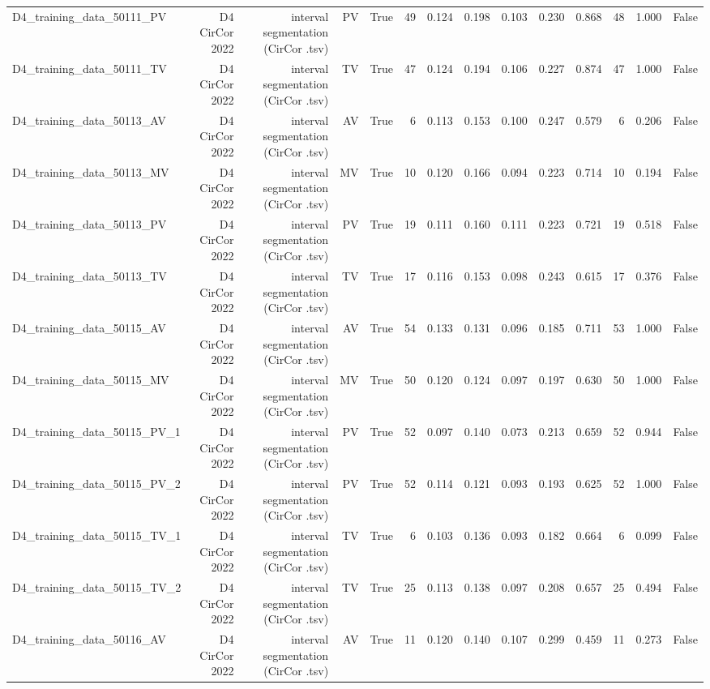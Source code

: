 \begin{table}[htbp]
\begin{tabular}{lrrrrrrrrrrrrr}
    D4\_training\_data\_50111\_PV & D4 CirCor 2022 & interval segmentation (CirCor .tsv) & PV & True & 49 & 0.124 & 0.198 & 0.103 & 0.230 & 0.868 & 48 & 1.000 & False \\
    D4\_training\_data\_50111\_TV & D4 CirCor 2022 & interval segmentation (CirCor .tsv) & TV & True & 47 & 0.124 & 0.194 & 0.106 & 0.227 & 0.874 & 47 & 1.000 & False \\
    D4\_training\_data\_50113\_AV & D4 CirCor 2022 & interval segmentation (CirCor .tsv) & AV & True & 6 & 0.113 & 0.153 & 0.100 & 0.247 & 0.579 & 6 & 0.206 & False \\
    D4\_training\_data\_50113\_MV & D4 CirCor 2022 & interval segmentation (CirCor .tsv) & MV & True & 10 & 0.120 & 0.166 & 0.094 & 0.223 & 0.714 & 10 & 0.194 & False \\
    D4\_training\_data\_50113\_PV & D4 CirCor 2022 & interval segmentation (CirCor .tsv) & PV & True & 19 & 0.111 & 0.160 & 0.111 & 0.223 & 0.721 & 19 & 0.518 & False \\
    D4\_training\_data\_50113\_TV & D4 CirCor 2022 & interval segmentation (CirCor .tsv) & TV & True & 17 & 0.116 & 0.153 & 0.098 & 0.243 & 0.615 & 17 & 0.376 & False \\
    D4\_training\_data\_50115\_AV & D4 CirCor 2022 & interval segmentation (CirCor .tsv) & AV & True & 54 & 0.133 & 0.131 & 0.096 & 0.185 & 0.711 & 53 & 1.000 & False \\
    D4\_training\_data\_50115\_MV & D4 CirCor 2022 & interval segmentation (CirCor .tsv) & MV & True & 50 & 0.120 & 0.124 & 0.097 & 0.197 & 0.630 & 50 & 1.000 & False \\
    D4\_training\_data\_50115\_PV\_1 & D4 CirCor 2022 & interval segmentation (CirCor .tsv) & PV & True & 52 & 0.097 & 0.140 & 0.073 & 0.213 & 0.659 & 52 & 0.944 & False \\
    D4\_training\_data\_50115\_PV\_2 & D4 CirCor 2022 & interval segmentation (CirCor .tsv) & PV & True & 52 & 0.114 & 0.121 & 0.093 & 0.193 & 0.625 & 52 & 1.000 & False \\
    D4\_training\_data\_50115\_TV\_1 & D4 CirCor 2022 & interval segmentation (CirCor .tsv) & TV & True & 6 & 0.103 & 0.136 & 0.093 & 0.182 & 0.664 & 6 & 0.099 & False \\
    D4\_training\_data\_50115\_TV\_2 & D4 CirCor 2022 & interval segmentation (CirCor .tsv) & TV & True & 25 & 0.113 & 0.138 & 0.097 & 0.208 & 0.657 & 25 & 0.494 & False \\
    D4\_training\_data\_50116\_AV & D4 CirCor 2022 & interval segmentation (CirCor .tsv) & AV & True & 11 & 0.120 & 0.140 & 0.107 & 0.299 & 0.459 & 11 & 0.273 & False \\

\end{tabular}
\end{table}
